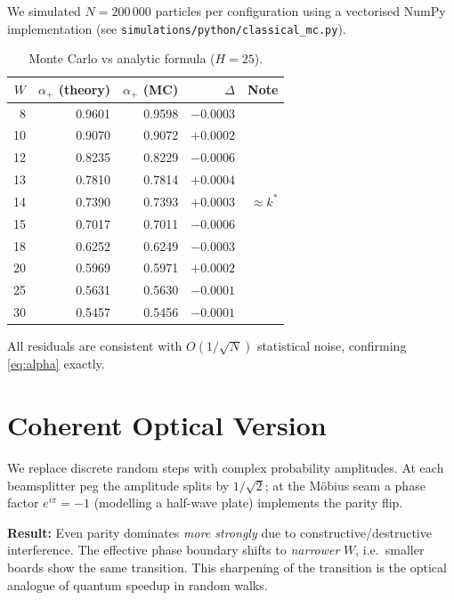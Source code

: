 \documentclass[12pt,a4paper]{article}
\newcommand{\kstar}{k^*}
\newcommand{\alphap}{\alpha_+}
\begin{document}
We simulated $N = 200\,000$ particles per configuration using a vectorised
NumPy implementation (see \texttt{simulations/python/classical\_mc.py}).

\begin{table}[H]
\centering
\caption{Monte Carlo vs analytic formula ($H = 25$).}
\label{tab:mc}
\begin{tabular}{rrrrr}
\toprule
$W$ & $\alphap$ (theory) & $\alphap$ (MC) & $\Delta$ & Note \\
\midrule
 8 & 0.9601 & 0.9598 & $-0.0003$ & \\
10 & 0.9070 & 0.9072 & $+0.0002$ & \\
12 & 0.8235 & 0.8229 & $-0.0006$ & \\
13 & 0.7810 & 0.7814 & $+0.0004$ & \\
14 & 0.7390 & 0.7393 & $+0.0003$ & $\approx \kstar$ \\
15 & 0.7017 & 0.7011 & $-0.0006$ & \\
18 & 0.6252 & 0.6249 & $-0.0003$ & \\
20 & 0.5969 & 0.5971 & $+0.0002$ & \\
25 & 0.5631 & 0.5630 & $-0.0001$ & \\
30 & 0.5457 & 0.5456 & $-0.0001$ & \\
\bottomrule
\end{tabular}
\end{table}

All residuals are consistent with $O(1/\sqrt{N})$ statistical noise,
confirming \eqref{eq:alpha} exactly.

\section{Coherent Optical Version}
\label{sec:optical}

We replace discrete random steps with complex probability amplitudes.
At each beamsplitter peg the amplitude splits by $1/\sqrt{2}$; at the
Möbius seam a phase factor $e^{i\pi} = -1$ (modelling a half-wave plate)
implements the parity flip.

\textbf{Result:} Even parity dominates \emph{more strongly} due to
constructive/destructive interference. The effective phase boundary shifts
to \emph{narrower} $W$, i.e.\ smaller boards show the same transition.
This sharpening of the transition is the optical analogue of quantum
speedup in random walks.
\end{document}
